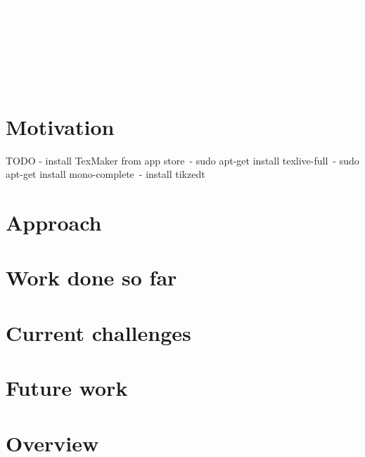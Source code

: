 \documentclass[%
    fourtothree=true, %
    DepLogo=true     %
    ]{ETHpres}
\newcommand*{\ETHtitle}{Closed-loop multi-sensor SLAM using factor graphs for fixed-wing UAV.}
\newcommand*{\ETHauthor}{Adam Radomski}
\begin{document}
\ETHtitelbild\textcolor{white}{\large\textbf{\ETHtitle}}\\~\newline\hspace{6mm}\normalsize%
\textcolor{white}{
\textbf{\ETHauthor}\\ \\
Master Thesis\\
Supervised by Timo Hinzmann, Thomas Schneider}\\


\ETHslide
\section*{Motivation}
TODO
- install TexMaker from app store\
- sudo apt-get install texlive-full\
- sudo apt-get install mono-complete\
- install tikzedt


\clearpage

\ETHslide
\section*{Approach}

\clearpage

\ETHslide
\section*{Work done so far}


\clearpage

\ETHslide
\section*{Current challenges}


\clearpage

\ETHslide
\section*{Future work}


\clearpage




\ETHslide
\section*{Overview}
\tableofcontents

\clearpage
\end{document}
